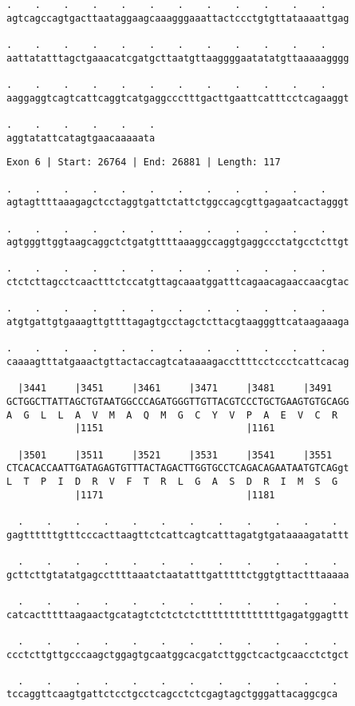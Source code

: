 \documentclass{article}
\begin{document}
\newpage
\begin{Verbatim}[fontfamily=courier]
.    .    .    .    .    .    .    .    .    .    .    .    
agtcagccagtgacttaataggaagcaaagggaaattactccctgtgttataaaattgag

.    .    .    .    .    .    .    .    .    .    .    .    
aattatatttagctgaaacatcgatgcttaatgttaaggggaatatatgttaaaaagggg

.    .    .    .    .    .    .    .    .    .    .    .    
aaggaggtcagtcattcaggtcatgaggccctttgacttgaattcatttcctcagaaggt

.    .    .    .    .    .
aggtatattcatagtgaacaaaaata
\end{Verbatim}
\newpage
\begin{Verbatim}[fontfamily=courier]
Exon 6 | Start: 26764 | End: 26881 | Length: 117

.    .    .    .    .    .    .    .    .    .    .    .    
agtagttttaaagagctcctaggtgattctattctggccagcgttgagaatcactagggt

.    .    .    .    .    .    .    .    .    .    .    .    
agtgggttggtaagcaggctctgatgttttaaaggccaggtgaggccctatgcctcttgt

.    .    .    .    .    .    .    .    .    .    .    .    
ctctcttagcctcaactttctccatgttagcaaatggatttcagaacagaaccaacgtac

.    .    .    .    .    .    .    .    .    .    .    .    
atgtgattgtgaaagttgttttagagtgcctagctcttacgtaagggttcataagaaaga

.    .    .    .    .    .    .    .    .    .    .    .    
caaaagtttatgaaactgttactaccagtcataaaagaccttttcctccctcattcacag

  |3441     |3451     |3461     |3471     |3481     |3491   
GCTGGCTTATTAGCTGTAATGGCCCAGATGGGTTGTTACGTCCCTGCTGAAGTGTGCAGG
A  G  L  L  A  V  M  A  Q  M  G  C  Y  V  P  A  E  V  C  R  
            |1151                         |1161             

  |3501     |3511     |3521     |3531     |3541     |3551   
CTCACACCAATTGATAGAGTGTTTACTAGACTTGGTGCCTCAGACAGAATAATGTCAGgt
L  T  P  I  D  R  V  F  T  R  L  G  A  S  D  R  I  M  S  G  
            |1171                         |1181             

  .    .    .    .    .    .    .    .    .    .    .    .  
gagttttttgtttcccacttaagttctcattcagtcatttagatgtgataaaagatattt

  .    .    .    .    .    .    .    .    .    .    .    .  
gcttcttgtatatgagccttttaaatctaatatttgatttttctggtgttactttaaaaa

  .    .    .    .    .    .    .    .    .    .    .    .  
catcactttttaagaactgcatagtctctctctcttttttttttttttgagatggagttt

  .    .    .    .    .    .    .    .    .    .    .    .  
ccctcttgttgcccaagctggagtgcaatggcacgatcttggctcactgcaacctctgct

  .    .    .    .    .    .    .    .    .    .    .    .
tccaggttcaagtgattctcctgcctcagcctctcgagtagctgggattacaggcgca
\end{Verbatim}
\end{document}
